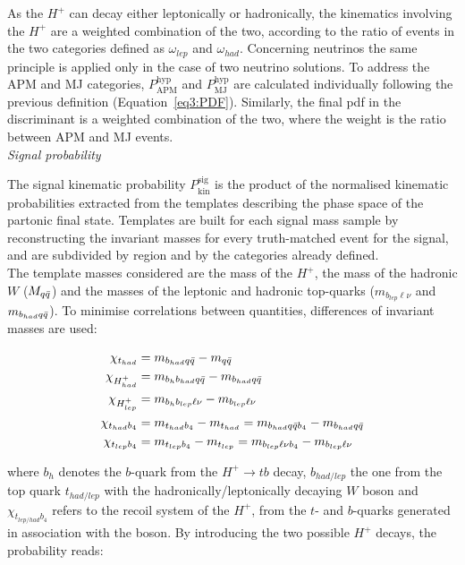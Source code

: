 As the $H^+$ can decay either leptonically or hadronically, the kinematics involving the $H^+$ are a weighted combination of the two, according to the ratio of events in the two categories defined as $\omega_{lep}$ and $\omega_{had}$. Concerning neutrinos the same principle is applied only in the case of two neutrino solutions. To address the APM and MJ categories, $P^{\text{hyp}}_{\text{APM}}$ and $P^{\text{hyp}}_{\text{MJ}}$ are calculated individually following the previous definition (Equation~\ref{eq3:PDF}). Similarly, the final pdf in the discriminant is a weighted combination of the two, where the weight is the ratio between APM and MJ events.\\


\textit{Signal probability}

The signal kinematic probability $P^{\text{sig}}_{\text{kin}}$ is the product of the normalised kinematic probabilities extracted from the templates describing the phase space of the partonic final state. Templates are built for each signal mass sample by reconstructing the invariant masses for every truth-matched event for the signal, and are subdivided by region and by the categories already defined.\\

The template masses considered are the mass of the $H^+$, the mass of the hadronic $W$ ($M_{q\Bar{q}}$) and the masses of the leptonic and hadronic top-quarks ($m_{b_{lep}\ell\nu}$ and $m_{b_{had}q\Bar{q}}$). To minimise correlations between quantities, differences of invariant masses are used:

\begin{align}
    \begin{split} 
    \chi_{t_{had}}&=m_{b_{had}q\Bar{q}}-m_{q\Bar{q}} \\ 
    \chi_{H^+_{had}}&=m_{b_hb_{had}q\Bar{q}}-m_{b_{had}q\Bar{q}} \\
    \chi_{H^+_{lep}}&=m_{b_hb_{lep}\ell\nu}-m_{b_{lep}\ell\nu}\\
    \chi_{t_{had}b_4}&=m_{t_{had}b_4}-m_{t_{had}}=m_{b_{had}q\bar{q}b_4}-m_{b_{had}q\bar{q}}\\
    \chi_{t_{lep}b_4}&=m_{t_{lep}b_4}-m_{t_{lep}}=m_{b_{lep}\ell\nu b_4}-m_{b_{lep}\ell\nu}\\
    \end{split} 
\end{align}

where $b_h$ denotes the $b$-quark from the $H^+\to tb$ decay, $b_{had/lep}$ the one from the top quark $t_{had/lep}$ with the hadronically/leptonically decaying $W$ boson and $\chi_{t_{lep/had}b_4}$ refers to the recoil system of the $H^+$, from the $t$- and $b$-quarks generated in association with the boson. By introducing the two possible $H^+$ decays, the probability reads:

